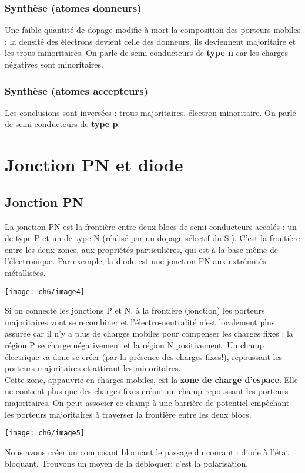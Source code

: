 		\subsubsection{Synthèse (atomes donneurs)}
		Une faible quantité de dopage modifie à mort la composition des porteurs 
		mobiles : la densité des électrons devient celle des donneurs, ils deviennent 
		majoritaire et les trous minoritaires. On parle de semi-conducteurs de 
		\textbf{type n} car les charges négatives sont minoritaires.

		\subsubsection{Synthèse (atomes accepteurs)}
		Les conclusions sont inversées : trous majoritaires, électron minoritaire. On 
		parle de semi-conducteurs de \textbf{type p}.
		
		
\section{Jonction PN et diode}
	\subsection{Jonction PN}
	La jonction PN est la frontière entre deux blocs de semi-conducteurs accolés : 
	un de type P et un de type N (réalisé par un dopage sélectif du Si). C'est la 
	frontière entre les deux zones, aux propriétés particulières, qui est à la base
	même de l'électronique. Par exemple, la diode est une jonction PN aux 
	extrémités métallisées.
	\begin{center}
	\texttt{[image: ch6/image4]}
	\end{center}
	Si on connecte les jonctions P et N, à la frontière (jonction) les porteurs majoritaires 
	vont se recombiner et l’électro-neutralité n'est localement plus assurée car 
	il n'y a plus de charges mobiles pour compenser les charges fixes : la région P 
	se charge négativement et la région N positivement. Un champ électrique 
	va donc se créer (par la présence des charges fixes!), repoussant les porteurs 
	majoritaires et attirant les minoritaires.\\
	
	Cette zone, appauvrie en charges mobiles, est la \textbf{zone de charge d'espace}. 
	Elle ne contient plus que des charges fixes créant un champ repoussant les 
	porteurs majoritaires. On peut associer ce champ à une barrière de potentiel 
	empêchant les porteurs majoritaires à traverser la frontière entre les deux blocs.
		\begin{center}
	\texttt{[image: ch6/image5]}
	\end{center}
	Nous avons créer un composant bloquant le passage du courant : diode à l'état 
	bloquant. Trouvons un moyen de la débloquer: c'est la polarisation.	
	
